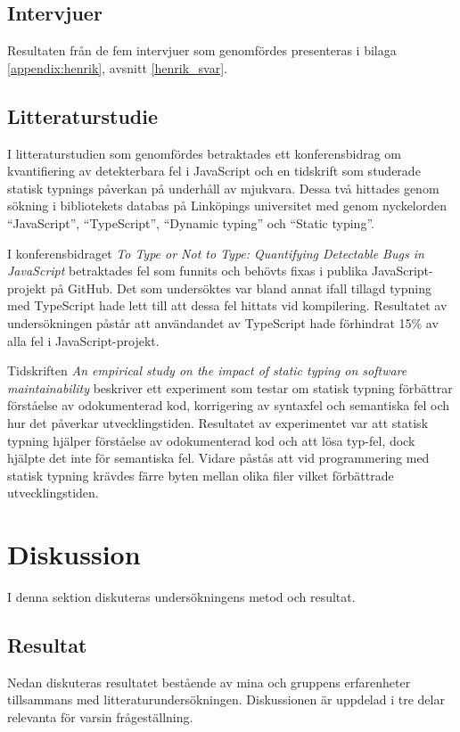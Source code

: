 \subsection{Intervjuer}
Resultaten från de fem intervjuer som genomfördes presenteras i bilaga \ref{appendix:henrik}, avsnitt \ref{henrik_svar}.
\subsection{Litteraturstudie}
I litteraturstudien som genomfördes betraktades ett konferensbidrag om kvantifiering av detekterbara fel i JavaScript och en tidskrift som studerade statisk typnings påverkan på underhåll av mjukvara. Dessa två hittades genom sökning i bibliotekets databas på Linköpings universitet med genom nyckelorden ``JavaScript'', ``TypeScript'', ``Dynamic typing'' och ``Static typing''.

I konferensbidraget \textit{To Type or Not to Type:
Quantifying Detectable Bugs in JavaScript} \cite{henrik_totypeornot} betraktades fel som funnits och behövts fixas i publika JavaScript-projekt på GitHub. Det som undersöktes var bland annat ifall tillagd typning med TypeScript hade lett till att dessa fel hittats vid kompilering.
Resultatet av undersökningen påstår att användandet av TypeScript hade förhindrat 15\% av alla fel i JavaScript-projekt.

Tidskriften \textit{An empirical study on the impact of static typing
on software maintainability} \cite{henrik_maintainability} beskriver ett experiment som testar om statisk typning förbättrar förståelse av odokumenterad kod, korrigering av syntaxfel och semantiska fel och hur det påverkar utvecklingstiden.
Resultatet av experimentet var att statisk typning hjälper förståelse av odokumenterad kod och att lösa typ-fel, dock hjälpte det inte för semantiska fel. Vidare påstås att vid programmering med statisk typning krävdes färre byten mellan olika filer vilket förbättrade utvecklingstiden.

\section{Diskussion}
I denna sektion diskuteras undersökningens metod och resultat.
\subsection{Resultat}
Nedan diskuteras resultatet bestående av mina och gruppens erfarenheter tillsammans med litteraturundersökningen. Diskussionen är uppdelad i tre delar relevanta för varsin frågeställning.
